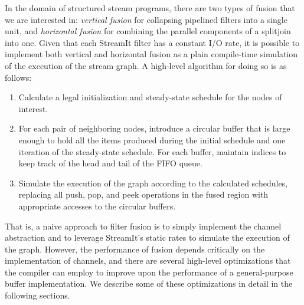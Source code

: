 In the domain of structured stream programs, there are two types of
fusion that we are interested in: {\it vertical fusion} for collapsing
pipelined filters into a single unit, and {\it horizontal fusion} for
combining the parallel components of a splitjoin into one.  Given that
each StreamIt filter has a constant I/O rate, it is possible to
implement both vertical and horizontal fusion as a plain compile-time
simulation of the execution of the stream graph.  A high-level
algorithm for doing so is as follows:
\begin{enumerate}
\item Calculate a legal initialization and steady-state schedule for
the nodes of interest.

\item For each pair of neighboring nodes, introduce a circular buffer
that is large enough to hold all the items produced during the initial
schedule and one iteration of the steady-state schedule.  For each
buffer, maintain indices to keep track of the head and tail of the
FIFO queue.

\item Simulate the execution of the graph according to the calculated
schedules, replacing all push, pop, and peek operations in the fused
region with appropriate accesses to the circular buffers.
\end{enumerate}
That is, a naive approach to filter fusion is to simply implement the
channel abstraction and to leverage StreamIt's static rates to
simulate the execution of the graph.  However, the performance of
fusion depends critically on the implementation of channels, and there
are several high-level optimizations that the compiler can employ to
improve upon the performance of a general-purpose buffer
implementation.  We describe some of these optimizations in detail in
the following sections.

